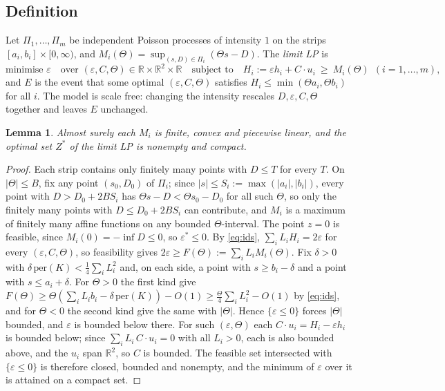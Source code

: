 \documentclass[11pt]{amsart}
\newtheorem{lemma}[theorem]{Lemma}
\theoremstyle{remark}\newtheorem{remark}[theorem]{Remark}
\newcommand{\R}{\mathbb{R}}
\begin{document}
\subsection*{Definition}
Let $\Pi_1,\dots,\Pi_m$ be independent Poisson processes of intensity $1$ on the strips $[a_i,b_i]\times[0,\infty)$,
and $M_i(\Theta)=\sup_{(s,D)\in\Pi_i}(\Theta s-D)$. The \emph{limit LP} is
\[
\text{minimise }\varepsilon\quad\text{over }(\varepsilon,C,\Theta)\in\R\times\R^2\times\R\quad\text{subject to}\quad
H_i:=\varepsilon h_i+C\cdot u_i\ \ge\ M_i(\Theta)\ \ (i=1,\dots,m),
\]
and $E$ is the event that some optimal $(\varepsilon,C,\Theta)$ satisfies $H_i\le\min(\Theta a_i,\Theta b_i)$ for
all $i$. The model is scale free: changing the intensity rescales $D,\varepsilon,C,\Theta$ together and leaves $E$
unchanged.

\begin{lemma}\label{lem:exist}
Almost surely each $M_i$ is finite, convex and piecewise linear, and the optimal set $Z^*$ of the limit LP is nonempty
and compact.
\end{lemma}

\begin{proof}
Each strip contains only finitely many points with $D\le T$ for every $T$. On $|\Theta|\le B$, fix any point
$(s_0,D_0)$ of $\Pi_i$; since $|s|\le S_i:=\max(|a_i|,|b_i|)$, every point with $D>D_0+2BS_i$ has $\Theta s-D<\Theta
s_0-D_0$ for all such $\Theta$, so only the finitely many points with $D\le D_0+2BS_i$ can contribute, and $M_i$ is a
maximum of finitely many affine functions on any bounded $\Theta$-interval. The point $z=0$ is feasible, since $M_i(0)=-\inf D\le0$, so
$\varepsilon^*\le0$. By \eqref{eq:ids}, $\sum_iL_iH_i=2\varepsilon$ for every $(\varepsilon,C,\Theta)$, so feasibility gives
$2\varepsilon\ge F(\Theta):=\sum_iL_iM_i(\Theta)$. Fix $\delta>0$ with $\delta\,\mathrm{per}(K)<\tfrac14\sum_iL_i^2$
and, on each side, a point with $s\ge b_i-\delta$ and a point with $s\le a_i+\delta$. For $\Theta>0$ the first kind give
$F(\Theta)\ge\Theta(\sum_iL_ib_i-\delta\,\mathrm{per}(K))-O(1)\ge\frac\Theta4\sum_iL_i^2-O(1)$ by \eqref{eq:ids}, and
for $\Theta<0$ the second kind give the same with $|\Theta|$. Hence $\{\varepsilon\le0\}$ forces $|\Theta|$ bounded, and
$\varepsilon$ is bounded below there. For such $(\varepsilon,\Theta)$ each $C\cdot u_i=H_i-\varepsilon h_i$ is bounded
below; since $\sum_iL_i\,C\cdot u_i=0$ with all $L_i>0$, each is also bounded above, and the $u_i$ span $\R^2$, so $C$ is
bounded. The feasible set intersected with $\{\varepsilon\le0\}$ is therefore closed, bounded and nonempty, and the
minimum of $\varepsilon$ over it is attained on a compact set.
\end{proof}
\end{document}

